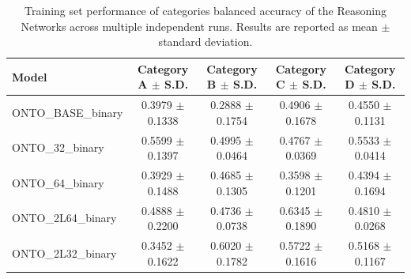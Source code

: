 \begin{table}[t]
\centering
\begin{tabular}{l c c c c}
\toprule
Model & Category A $\pm$ S.D. & Category B $\pm$ S.D. & Category C $\pm$ S.D. & Category D $\pm$ S.D. \\
\midrule
ONTO_BASE_binary & 0.3979 $\pm$ 0.1338 & 0.2888 $\pm$ 0.1754 & 0.4906 $\pm$ 0.1678 & 0.4550 $\pm$ 0.1131 \\
ONTO_32_binary & 0.5599 $\pm$ 0.1397 & 0.4995 $\pm$ 0.0464 & 0.4767 $\pm$ 0.0369 & 0.5533 $\pm$ 0.0414 \\
ONTO_64_binary & 0.3929 $\pm$ 0.1488 & 0.4685 $\pm$ 0.1305 & 0.3598 $\pm$ 0.1201 & 0.4394 $\pm$ 0.1694 \\
ONTO_2L64_binary & 0.4888 $\pm$ 0.2200 & 0.4736 $\pm$ 0.0738 & 0.6345 $\pm$ 0.1890 & 0.4810 $\pm$ 0.0268 \\
ONTO_2L32_binary & 0.3452 $\pm$ 0.1622 & 0.6020 $\pm$ 0.1782 & 0.5722 $\pm$ 0.1616 & 0.5168 $\pm$ 0.1167 \\
\bottomrule
\end{tabular}
\caption{Training set performance of categories balanced accuracy of the Reasoning Networks across multiple independent runs. Results are reported as mean $\pm$ standard deviation.}
\label{tab:training_rn_results}
\end{table}